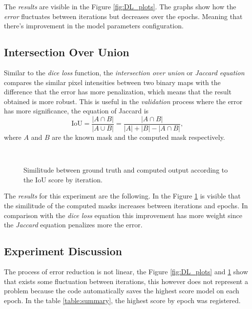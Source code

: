 The \emph{results} are visible in the Figure \ref{fig:DL_plots}. The graphs show how the \emph{error} fluctuates between iterations but decreases over the epochs. Meaning that there's improvement in the model parameters configuration.


\subsection{Intersection Over Union}
Similar to the \emph{dice loss} function, the \emph{intersection over union} or \emph{Jaccard equation} compares the similar pixel intensities between two binary maps with the difference that the error has more penalization, which means that the result obtained is more robust. This is useful in the \emph{validation} process where the error has more significance, the equation of Jaccard is
\begin{equation}\label{eq:jacc}
  \text{IoU} = \frac{|A \cap B|}{| A \cup B |} = \frac{|A \cap B|}{|A| + |B| - |A \cap B|} \text{,}
\end{equation}
where $A$ and $B$ are the known mask and the computed mask respectively.

\begin{figure}[h]
  \centering
   \\
  \caption{Similitude between ground truth and computed output according to the IoU score by iteration.}
  \label{fig:IoU_plots}
\end{figure}

The \emph{results} for this experiment are the following. In the Figure \ref{fig:IoU_plots} is visible that the similitude of the computed masks increases between iterations and epochs. In comparison with the \emph{dice loss} equation this improvement has more weight since the \emph{Jaccard} equation penalizes more the error. 


\subsection{Experiment Discussion}

The process of error reduction is not linear, the Figure \ref{fig:DL_plots} and \ref{fig:IoU_plots} show that exists some fluctuation between iterations, this however does not represent a problem because the code automatically saves the highest score model on each epoch. In the table \ref{table:summary}, the highest score by epoch was registered.

